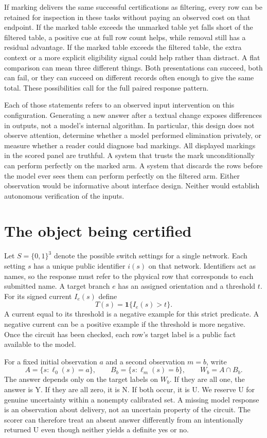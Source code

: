 \documentclass[12pt,letterpaper]{article}
\begin{document}
If marking delivers the same successful certifications as filtering, every row can be retained for inspection in these tasks without paying an observed cost on that endpoint. If the marked table exceeds the unmarked table yet falls short of the filtered table, a positive cue at full row count helps, while removal still has a residual advantage. If the marked table exceeds the filtered table, the extra context or a more explicit eligibility signal could help rather than distract. A flat comparison can mean three different things. Both presentations can succeed, both can fail, or they can succeed on different records often enough to give the same total. These possibilities call for the full paired response pattern.

Each of those statements refers to an observed input intervention on this configuration. Generating a new answer after a textual change exposes differences in outputs, not a model's internal algorithm. In particular, this design does not observe attention, determine whether a model performed elimination privately, or measure whether a reader could diagnose bad markings. All displayed markings in the scored panel are truthful. A system that trusts the mark unconditionally can perform perfectly on the marked arm. A system that discards the rows before the model ever sees them can perform perfectly on the filtered arm. Either observation would be informative about interface design. Neither would establish autonomous verification of the inputs.

\section{The object being certified}

Let $S=\{0,1\}^3$ denote the possible switch settings for a single network. Each setting $s$ has a unique public identifier $i(s)$ on that network. Identifiers act as names, so the response must refer to the physical row that corresponds to each submitted name. A target branch $e$ has an assigned orientation and a threshold $t$. For its signed current $I_e(s)$ define
\[
 T(s)=\mathbf 1\{I_e(s)>t\}.
\]
A current equal to its threshold is a negative example for this strict predicate. A negative current can be a positive example if the threshold is more negative. Once the circuit has been checked, each row's target label is a public fact available to the model.

For a fixed initial observation $a$ and a second observation $m=b$, write
\[
 A=\{s:\ell_0(s)=a\},\qquad B_b=\{s:\ell_m(s)=b\},\qquad W_b=A\cap B_b .
\]
The answer depends only on the target labels on $W_b$. If they are all one, the answer is Y. If they are all zero, it is N. If both occur, it is U. We reserve U for genuine uncertainty within a nonempty calibrated set. A missing model response is an observation about delivery, not an uncertain property of the circuit. The scorer can therefore treat an absent answer differently from an intentionally returned U even though neither yields a definite yes or no.
\end{document}
